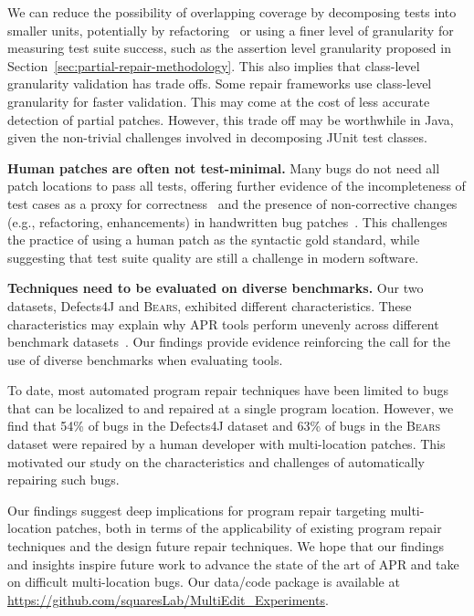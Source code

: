 \documentclass[10pt,journal,compsoc]{IEEEtran}
\newcommand\bears{\textsc{Bears}\xspace}
\begin{document}
We can reduce the possibility of overlapping coverage by decomposing tests into
smaller units, potentially by
refactoring~\cite{b-refactoring} or using a finer level of granularity for
measuring test suite success, such as the assertion level granularity proposed
in Section~\ref{sec:partial-repair-methodology}.
This also implies that class-level granularity validation has trade offs. Some
repair frameworks use class-level granularity for faster validation. This may
come at the cost of less accurate detection of partial patches. However, this
trade off may be worthwhile in Java, given the non-trivial challenges involved in
decomposing JUnit test classes.

\vspace{1ex}
\noindent\textbf{Human patches are often not test-minimal.}
Many bugs do not need all patch locations to pass all tests,
offering further evidence of the incompleteness of test cases as a
proxy for correctness~\cite{patch-correctness} and the
presence of non-corrective changes (e.g., refactoring, enhancements)
in handwritten bug patches~\cite{api-refactoring, tangledchanges}.  This
challenges the practice of using a human patch as the syntactic gold standard,
while suggesting that test suite quality
are still a challenge in modern software.

\vspace{1ex}
\noindent\textbf{Techniques need to be evaluated on diverse benchmarks.}
Our two datasets, Defects4J and \bears, exhibited different characteristics.
These characteristics may explain why APR tools perform unevenly across
different benchmark datasets~\cite{durieux-repair-them-all}. Our findings
provide evidence reinforcing the call for the use of diverse benchmarks when
evaluating tools.

\vspace{1ex}
To date, most automated program repair techniques have been limited to bugs that
can be localized to and repaired at a single program location. However, we find
that 54\% of bugs in the Defects4J dataset and 63\% of bugs in the \bears dataset
were repaired by a human developer with multi-location patches. This motivated
our study on the characteristics and challenges of automatically repairing such bugs. 

Our findings suggest deep implications for program repair targeting
multi-location patches, both in terms of the applicability of existing program
repair techniques and the design future repair techniques.  We hope that our
findings and insights inspire future work to advance the state of the art of APR
and take on difficult multi-location bugs.  Our data/code package is
available at \url{https://github.com/squaresLab/MultiEdit_Experiments}.
\end{document}
